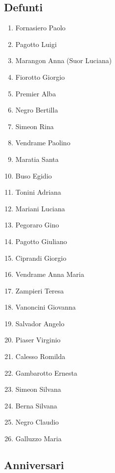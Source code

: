 \subsection{Defunti}
\begin{multicols}{2}
\begin{enumerate}
  \item Fornasiero Paolo
  \item Pagotto Luigi
  \item Marangon Anna (Suor Luciana)
  \item Fiorotto Giorgio
  \item Premier Alba
  \item Negro Bertilla
  \item Simeon Rina
  \item Vendrame Paolino
  \item Maratia Santa
  \item Buso Egidio
  \item Tonini Adriana
  \item Mariani Luciana
  \item Pegoraro Gino
  \item Pagotto Giuliano
  \item Ciprandi Giorgio
  \item Vendrame Anna Maria
  \item Zampieri Teresa
  \item Vanoncini Giovanna
  \item Salvador Angelo
  \item Piaser Virginio
  \item Calesso Romilda
  \item Gambarotto Ernesta
  \item Simeon Silvana
  \item Berna Silvana
  \item Negro Claudio
  \item Galluzzo Maria
\end{enumerate}
\end{multicols}

\subsection{Anniversari}

